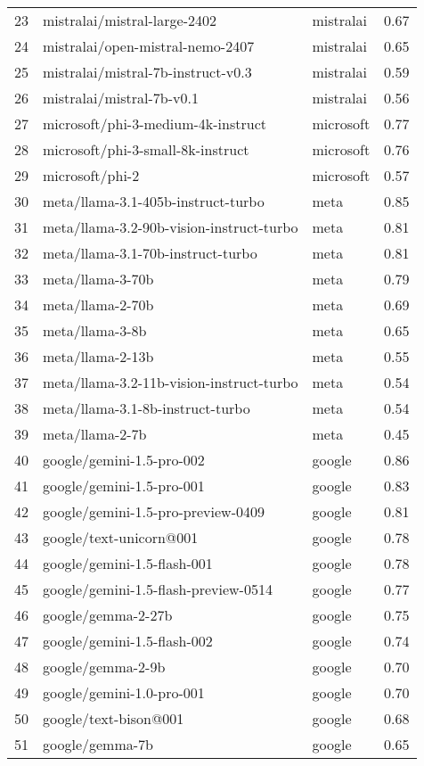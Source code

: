 \begin{longtable}{lllr}
23 & mistralai/mistral-large-2402 & mistralai & 0.67 \\
24 & mistralai/open-mistral-nemo-2407 & mistralai & 0.65 \\
25 & mistralai/mistral-7b-instruct-v0.3 & mistralai & 0.59 \\
26 & mistralai/mistral-7b-v0.1 & mistralai & 0.56 \\
27 & microsoft/phi-3-medium-4k-instruct & microsoft & 0.77 \\
28 & microsoft/phi-3-small-8k-instruct & microsoft & 0.76 \\
29 & microsoft/phi-2 & microsoft & 0.57 \\
30 & meta/llama-3.1-405b-instruct-turbo & meta & 0.85 \\
31 & meta/llama-3.2-90b-vision-instruct-turbo & meta & 0.81 \\
32 & meta/llama-3.1-70b-instruct-turbo & meta & 0.81 \\
33 & meta/llama-3-70b & meta & 0.79 \\
34 & meta/llama-2-70b & meta & 0.69 \\
35 & meta/llama-3-8b & meta & 0.65 \\
36 & meta/llama-2-13b & meta & 0.55 \\
37 & meta/llama-3.2-11b-vision-instruct-turbo & meta & 0.54 \\
38 & meta/llama-3.1-8b-instruct-turbo & meta & 0.54 \\
39 & meta/llama-2-7b & meta & 0.45 \\
40 & google/gemini-1.5-pro-002 & google & 0.86 \\
41 & google/gemini-1.5-pro-001 & google & 0.83 \\
42 & google/gemini-1.5-pro-preview-0409 & google & 0.81 \\
43 & google/text-unicorn@001 & google & 0.78 \\
44 & google/gemini-1.5-flash-001 & google & 0.78 \\
45 & google/gemini-1.5-flash-preview-0514 & google & 0.77 \\
46 & google/gemma-2-27b & google & 0.75 \\
47 & google/gemini-1.5-flash-002 & google & 0.74 \\
48 & google/gemma-2-9b & google & 0.70 \\
49 & google/gemini-1.0-pro-001 & google & 0.70 \\
50 & google/text-bison@001 & google & 0.68 \\
51 & google/gemma-7b & google & 0.65 \\

\end{longtable}
